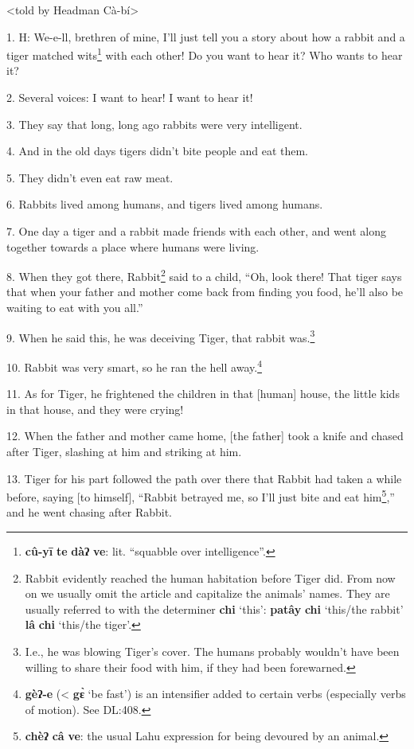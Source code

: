\setcounter{footnote}{0}

<told by Headman Cà-bí>

1. H: We-e-ll, brethren of mine, I'll just tell you a story about how a rabbit
and a tiger matched wits\footnote{\textbf{cû-yī} \textbf{te} \textbf{dàʔ} \textbf{ve}: lit. ``squabble over intelligence''.} with each other! Do you want to hear it? Who wants to hear it?

2. Several voices: I want to hear! I want to hear it!

3. They say that long, long ago rabbits were very intelligent.

4. And in the old days tigers didn't bite people and eat them.

5. They didn't even eat raw meat.

6. Rabbits lived among humans, and tigers lived among humans.

7. One day a tiger and a rabbit made friends with each other, and went along together
towards a place where humans were living.

8. When they got there, Rabbit\footnote{Rabbit evidently reached the human habitation before Tiger did. From now on we usually omit the article and capitalize the animals' names. They are usually referred to with the determiner \textbf{chi} `this': \textbf{patây} \textbf{chi} `this/the rabbit' \textbf{lâ} \textbf{chi} `this/the tiger'.} said to a child, ``Oh, look there! That tiger
says that when your father and mother come back from finding you food, he'll also be waiting to eat with you all.''

9. When he said this, he was deceiving Tiger, that rabbit was.\footnote{I.e., he was blowing Tiger's cover. The humans probably wouldn't have been willing to share their food with him, if they had been forewarned.}

10. Rabbit was very smart, so he ran the hell away.\footnote{\textbf{gèʔ-e} (< \textbf{gɛ̀} `be fast') is an intensifier added to certain verbs (especially verbs of motion). See DL:408.}

11. As for Tiger, he frightened the children in that [human] house, the little
kids in that house, and they were crying!

12. When the father and mother came home, [the father] took a knife and chased
after Tiger, slashing at him and striking at him.

13. Tiger for his part followed the path over there that Rabbit had taken a while
before, saying [to himself], ``Rabbit betrayed me, so I'll just bite and eat him\footnote{\textbf{chèʔ} \textbf{câ} \textbf{ve}: the usual Lahu expression for being devoured by an animal.},'' and he went chasing after Rabbit.


